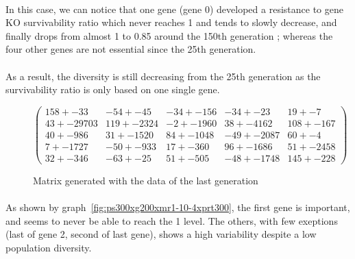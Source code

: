\documentclass[]{report} %
\begin{document}
    \paragraph*{}
    In this case, we can notice that one gene (gene 0) developed a resistance to gene KO survivability ratio which never reaches 1 and tends to slowly decrease, 
    and finally drops from almost 1 to 0.85 around the 150th generation ; whereas the four other genes are not essential since the 25th generation.
    \paragraph*{}
    As a result, the diversity is still decreasing from the 25th generation as the survivability ratio is only based on one single gene.

    \begin{figure}[H] 
            \centering
            \small
    $
          \begin{pmatrix}
                158 +- 33 & -54 +- 45 & -34 +- 156 & -34 +- 23 & 19 +- 7 \\
                43 +- 29703 & 119 +- 2324 & -2 +- 1960 & 38 +- 4162 & 108 +- 167 \\
                40 +- 986 & 31 +- 1520 & 84 +- 1048 & -49 +- 2087 & 60 +- 4 \\
                7 +- 1727 & -50 +- 933 & 17 +- 360 & 96 +- 1686 & 51 +- 2458 \\
                32 +- 346 & -63 +- 25 & 51 +- 505 & -48 +- 1748 & 145 +- 228 
           \end{pmatrix}
    $
            \caption{\footnotesize Matrix generated with the data of the last generation}
            \label{mat:ps300xg200xmr1-10-4xprt300}
    \end{figure}
    \paragraph*{}
    As shown by graph~\ref{fig:ps300xg200xmr1-10-4xprt300}, the first gene is important, and seems to never be able to reach the 1 level.
    The others, with few exeptions (last of gene 2, second of last gene), shows a high variability despite a low population diversity.
    
    
    
    
    \newpage
\end{document}
